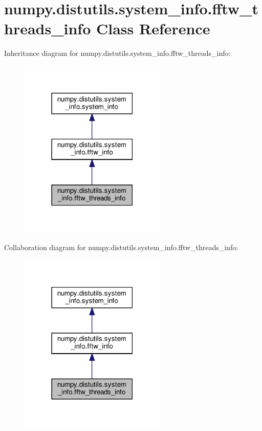 \hypertarget{classnumpy_1_1distutils_1_1system__info_1_1fftw__threads__info}{}\section{numpy.\+distutils.\+system\+\_\+info.\+fftw\+\_\+threads\+\_\+info Class Reference}
\label{classnumpy_1_1distutils_1_1system__info_1_1fftw__threads__info}


Inheritance diagram for numpy.\+distutils.\+system\+\_\+info.\+fftw\+\_\+threads\+\_\+info\+:
\nopagebreak
\begin{figure}[H]
\begin{center}
\leavevmode
\includegraphics[width=198pt]{classnumpy_1_1distutils_1_1system__info_1_1fftw__threads__info__inherit__graph}
\end{center}
\end{figure}


Collaboration diagram for numpy.\+distutils.\+system\+\_\+info.\+fftw\+\_\+threads\+\_\+info\+:
\nopagebreak
\begin{figure}[H]
\begin{center}
\leavevmode
\includegraphics[width=198pt]{classnumpy_1_1distutils_1_1system__info_1_1fftw__threads__info__coll__graph}
\end{center}
\end{figure}
